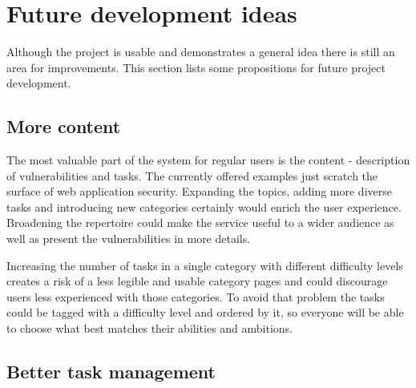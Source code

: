 \section{Future development ideas}

Although the project is usable and demonstrates a general idea there is still an area for improvements. This section lists some propositions for future project development.

\subsection{More content}

The most valuable part of the system for regular users is the content - description of vulnerabilities and tasks. The currently offered examples just scratch the surface of web application security. Expanding the topics, adding more diverse tasks and introducing new categories certainly would enrich the user experience. Broadening the repertoire could make the service useful to a wider audience as well as present the vulnerabilities in more details.

Increasing the number of tasks in a single category with different difficulty levels creates a risk of a less legible and usable category pages and could discourage users less experienced with those categories. To avoid that problem the tasks could be tagged with a difficulty level and ordered by it, so everyone will be able to choose what best matches their abilities and ambitions.

\subsection{Better task management}

